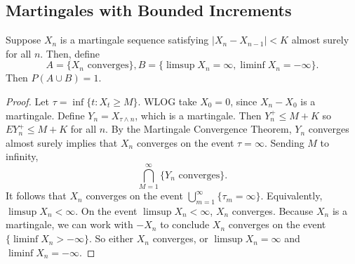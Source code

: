 \documentclass[11pt]{scrartcl}
\begin{document}
\subsection{Martingales with Bounded Increments}
\begin{thm} Suppose $X_n$ is a martingale sequence satisfying $|X_n - X_{n-1}| < K$ almost surely for all $n$.  Then, define 
$$A = \{X_n \text{ converges}\}, B = \{\limsup X_n = \infty, \liminf X_n = -\infty\}.$$
Then $P(A \cup B) = 1$. 
\end{thm}
\begin{proof}
Let $\tau = \inf \{t : X_t \ge M\}$.  WLOG take $X_0 = 0$, since $X_n - X_0$ is a martingale.    Define $Y_n = X_{\tau \wedge n}$, which is a martingale.  Then $Y_n^+ \le M+K$ so $EY_n^+ \le M+K$ for all $n$.  By the Martingale Convergence Theorem, $Y_n$ converges almost surely implies that $X_n$ converges on the event $\tau = \infty$.  Sending $M$ to infinity,
$$\bigcap_{M = 1}^{\infty} \{Y_n \text{ converges}\}.$$
It follows that $X_n$ converges on the event $\bigcup_{m=1}^{\infty} \{\tau_m = \infty\}$.  Equivalently, $\limsup X_n < \infty$.  On the event $\limsup X_n < \infty$, $X_n$ converges.  Because $X_n$ is a martingale, we can work with $-X_n$ to conclude $X_n$ converges on the event $\{\liminf X_n > -\infty\}$.  So either $X_n$ converges, or $\limsup X_n = \infty$ and $\liminf X_n = -\infty$.
\end{proof}
\end{document}
